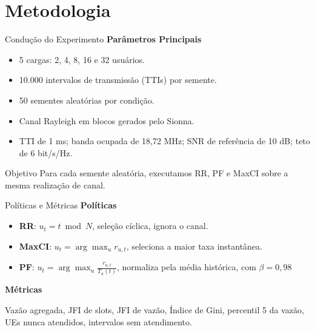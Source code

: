 \documentclass[noamsthm,notheorems,11pt,compress,fontset=windows]{beamer}
\numberwithin{figure}{section}
\numberwithin{table}{section}
\numberwithin{equation}{section}
\theoremstyle{plain} %
\begin{document}

\section{Metodologia}
\begin{frame}{Condução do Experimento}
    \textbf{Parâmetros Principais}
    \begin{itemize}
        \item 5 cargas: 2, 4, 8, 16 e 32 usuários.
        \item 10.000 intervalos de transmissão (TTIs) por semente.
        \item 50 sementes aleatórias por condição.
        \item Canal Rayleigh em blocos gerados pelo Sionna.
        \item TTI de 1 ms; banda ocupada de 18,72 MHz; SNR de referência de 10 dB; teto de 6 bit/s/Hz.

    \end{itemize}

    \begin{block}{Objetivo} Para cada semente aleatória, executamos RR, PF e MaxCI sobre a mesma realização de canal.
    \end{block}
\end{frame}

\begin{frame}{Políticas e Métricas}
    \textbf{Políticas}
    \begin{itemize}
        \item \textbf{RR}: \( u_t = t \bmod N \), seleção cíclica, ignora o canal.
        \item \textbf{MaxCI}: \( u_t = \arg\max_u r_{u,t} \), seleciona a maior taxa instantânea.
        \item \textbf{PF}: \( u_t = \arg\max_u \frac{r_{u,t}}{T_u(t)} \), normaliza pela média histórica, com $\beta=0{,}98$
    \vspace{2mm}
    \end{itemize}
    \textbf{Métricas} \par
    Vazão agregada, JFI de slots, JFI de vazão, Índice de Gini, percentil 5 da vazão, UEs nunca atendidos, intervalos sem atendimento.

\end{frame}
\end{document}
